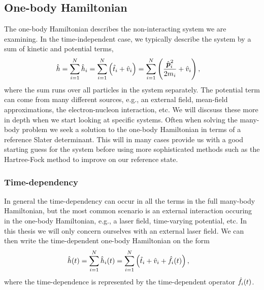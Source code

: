         \subsection{One-body Hamiltonian}
            The one-body Hamiltonian describes the non-interacting system we are
            examining.
            In the time-independent case, we typically describe the system by a
            sum of kinetic and potential terms,
            \begin{align}
                \hat{h}
                &= \sum_{i = 1}^{N}\hat{h}_i
                = \sum_{i = 1}^{N}\left( 
                    \hat{t}_i + \hat{v}_i
                 \right)
                = \sum_{i = 1}^{N}\left( 
                    \frac{\hat{\boldsymbol{p}}^2_i}{2m_i} + \hat{v}_i
                 \right),
            \end{align}
            where the sum runs over all particles in the system separately.
            The potential term can come from many different sources, e.g., an
            external field, mean-field approximations, the electron-nucleon
            interaction, etc.
            We will discsuss these more in depth when we start looking at
            specific systems.
            Often when solving the many-body problem we seek a solution to the
            one-body Hamiltonian in terms of a reference Slater determinant.
            This will in many cases provide us with a good starting guess for
            the system before using more sophisticated methods such as the
            Hartree-Fock method to improve on our reference state.

            \subsubsection{Time-dependency}
                In general the time-dependency can occur in all the terms in the
                full many-body Hamiltonian, but the most common scenario is an
                external interaction occuring in the one-body Hamiltonian, e.g.,
                a laser field, time-varying potential, etc.
                In this thesis we will only concern ourselves with an external
                laser field.
                We can then write the time-dependent one-body Hamiltonian on the
                form
                \begin{align}
                    \hat{h}(t)
                    &= \sum_{i = 1}^{N} \hat{h}_i(t)
                    = \sum_{i = 1}^{N}\left( 
                        \hat{t}_i
                        + \hat{v}_i
                        + \hat{f}_i(t)
                     \right),
                \end{align}
                where the time-dependence is represented by the time-dependent
                operator $\hat{f}_i(t)$.


